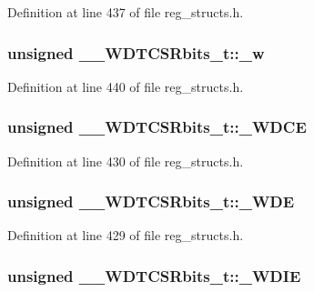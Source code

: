 Definition at line 437 of file reg\+\_\+structs.\+h.

\hypertarget{union_____w_d_t_c_s_rbits__t_ae5e9490ae3bbced4aa66938e374c05f2}{
\subsubsection[{\+\_\+w}]{\setlength{\rightskip}{0pt plus 5cm}unsigned \+\_\+\+\_\+\+W\+D\+T\+C\+S\+Rbits\+\_\+t\+::\+\_\+w}}\label{union_____w_d_t_c_s_rbits__t_ae5e9490ae3bbced4aa66938e374c05f2}


Definition at line 440 of file reg\+\_\+structs.\+h.

\hypertarget{union_____w_d_t_c_s_rbits__t_af5726163696ae37be037c6fd05b82df9}{
\subsubsection[{\+\_\+\+W\+D\+C\+E}]{\setlength{\rightskip}{0pt plus 5cm}unsigned \+\_\+\+\_\+\+W\+D\+T\+C\+S\+Rbits\+\_\+t\+::\+\_\+\+W\+D\+C\+E}}\label{union_____w_d_t_c_s_rbits__t_af5726163696ae37be037c6fd05b82df9}


Definition at line 430 of file reg\+\_\+structs.\+h.

\hypertarget{union_____w_d_t_c_s_rbits__t_a26fd056adee7c401d26d489f773c2226}{
\subsubsection[{\+\_\+\+W\+D\+E}]{\setlength{\rightskip}{0pt plus 5cm}unsigned \+\_\+\+\_\+\+W\+D\+T\+C\+S\+Rbits\+\_\+t\+::\+\_\+\+W\+D\+E}}\label{union_____w_d_t_c_s_rbits__t_a26fd056adee7c401d26d489f773c2226}


Definition at line 429 of file reg\+\_\+structs.\+h.

\hypertarget{union_____w_d_t_c_s_rbits__t_affe9114b82ea964a894cbc2f8ed4e278}{
\subsubsection[{\+\_\+\+W\+D\+I\+E}]{\setlength{\rightskip}{0pt plus 5cm}unsigned \+\_\+\+\_\+\+W\+D\+T\+C\+S\+Rbits\+\_\+t\+::\+\_\+\+W\+D\+I\+E}}\label{union_____w_d_t_c_s_rbits__t_affe9114b82ea964a894cbc2f8ed4e278}


